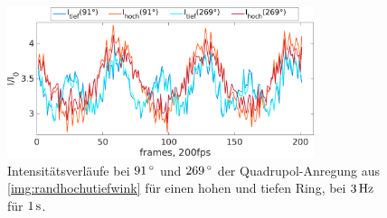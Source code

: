 \documentclass[numbers=noenddot,a4paper]{scrartcl}
\newcommand{\degree}{^\circ}
\begin{document}
						\begin{figure}[!t]
							\centering
							\includegraphics[width=0.8\textwidth,height=0.45\textwidth]{figs/auswertung/intens270u90hochutiefquad3Hz1sek.png}
							\caption{Intensitätsverläufe bei $\unit[91]{\degree}$ und $\unit[269]{\degree}$ der Quadrupol-Anregung aus \ref{img:randhochutiefwink} für einen hohen und tiefen Ring, bei $\unit[3]{Hz}$ für $\unit[1]{s}$. }
							\label{img:intensquadhochutief}
						\end{figure}
\end{document}

